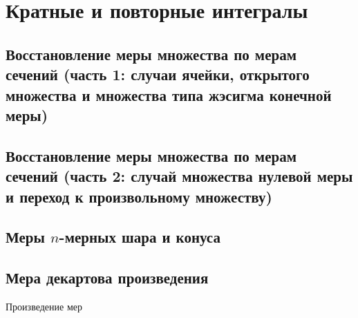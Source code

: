 \documentclass[12pt, a4paper, oneside]{memoir}
\begin{document}
\section{Кратные и повторные интегралы}

\subsection{Восстановление меры множества по мерам сечений
(часть 1: случаи ячейки, открытого множества и множества типа жэсигма конечной меры)}


\subsection{Восстановление меры множества по мерам сечений
(часть 2: случай множества нулевой меры и переход к произвольному множеству)}


\subsection{Меры $n$-мерных шара и конуса}


\subsection{Мера декартова произведения}

Произведение мер
\end{document}
